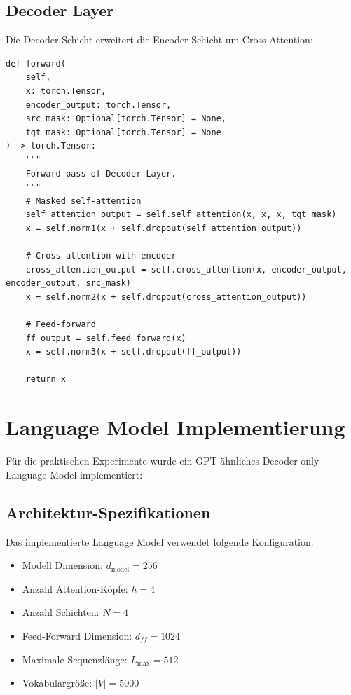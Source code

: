 \subsection{Decoder Layer}

Die Decoder-Schicht erweitert die Encoder-Schicht um Cross-Attention:

\begin{lstlisting}[style=pythonstyle, caption=Decoder Layer mit Cross-Attention]
def forward(
    self, 
    x: torch.Tensor, 
    encoder_output: torch.Tensor, 
    src_mask: Optional[torch.Tensor] = None,
    tgt_mask: Optional[torch.Tensor] = None
) -> torch.Tensor:
    """
    Forward pass of Decoder Layer.
    """
    # Masked self-attention
    self_attention_output = self.self_attention(x, x, x, tgt_mask)
    x = self.norm1(x + self.dropout(self_attention_output))
    
    # Cross-attention with encoder
    cross_attention_output = self.cross_attention(x, encoder_output, encoder_output, src_mask)
    x = self.norm2(x + self.dropout(cross_attention_output))
    
    # Feed-forward
    ff_output = self.feed_forward(x)
    x = self.norm3(x + self.dropout(ff_output))
    
    return x
\end{lstlisting}

\section{Language Model Implementierung}

Für die praktischen Experimente wurde ein GPT-ähnliches Decoder-only Language Model implementiert:

\subsection{Architektur-Spezifikationen}

Das implementierte Language Model verwendet folgende Konfiguration:
\begin{itemize}
    \item Modell Dimension: $d_{\text{model}} = 256$
    \item Anzahl Attention-Köpfe: $h = 4$
    \item Anzahl Schichten: $N = 4$
    \item Feed-Forward Dimension: $d_{ff} = 1024$
    \item Maximale Sequenzlänge: $L_{\max} = 512$
    \item Vokabulargröße: $|V| = 5000$
\end{itemize}

